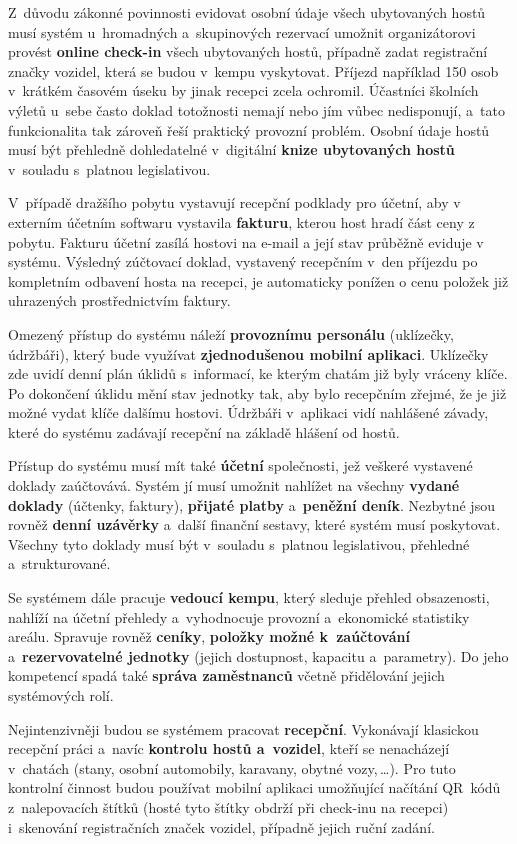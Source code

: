 Z~důvodu zákonné povinnosti evidovat osobní údaje všech ubytovaných hostů musí systém u~hromadných a~skupinových rezervací umožnit organizátorovi provést \textbf{online check-in} všech ubytovaných hostů, případně zadat registrační značky vozidel, která se budou v~kempu vyskytovat.
Příjezd například 150 osob v~krátkém časovém úseku by jinak recepci zcela ochromil.
Účastníci školních výletů u~sebe často doklad totožnosti nemají nebo jím vůbec nedisponují, a~tato funkcionalita tak zároveň řeší praktický provozní problém.
Osobní údaje hostů musí být přehledně dohledatelné v~digitální \textbf{knize ubytovaných hostů} v~souladu s~platnou legislativou.

V~případě dražšího pobytu vystavují recepční podklady pro účetní, aby v externím účetním softwaru vystavila \textbf{fakturu}, kterou host hradí část ceny z pobytu.
Fakturu účetní zasílá hostovi na e-mail a její stav průběžně eviduje v systému.
Výsledný zúčtovací doklad, vystavený recepčním v~den příjezdu po kompletním odbavení hosta na recepci, je automaticky ponížen o cenu položek již uhrazených prostřednictvím faktury.

Omezený přístup do systému náleží \textbf{provoznímu personálu} (uklízečky, údržbáři), který bude využívat \textbf{zjednodušenou mobilní aplikaci}.
Uklízečky zde uvidí denní plán úklidů s~informací, ke kterým chatám již byly vráceny klíče.
Po dokončení úklidu mění stav jednotky tak, aby bylo recepčním zřejmé, že je již možné vydat klíče dalšímu hostovi.
Údržbáři v~aplikaci vidí nahlášené závady, které do systému zadávají recepční na základě hlášení od hostů.

Přístup do systému musí mít také \textbf{účetní} společnosti, jež veškeré vystavené doklady zaúčtovává.
Systém jí musí umožnit nahlížet na všechny \textbf{vydané doklady} (účtenky, faktury), \textbf{přijaté platby} a~\textbf{peněžní deník}.
Nezbytné jsou rovněž \textbf{denní uzávěrky} a~další finanční sestavy, které systém musí poskytovat.
Všechny tyto doklady musí být v~souladu s~platnou legislativou, přehledné a~strukturované.

Se systémem dále pracuje \textbf{vedoucí kempu}, který sleduje přehled obsazenosti, nahlíží na účetní přehledy a~vyhodnocuje provozní a~ekonomické statistiky areálu.
Spravuje rovněž \textbf{ceníky}, \textbf{položky možné k~zaúčtování} a~\textbf{rezervovatelné jednotky} (jejich dostupnost, kapacitu a~parametry).
Do jeho kompetencí spadá také \textbf{správa zaměstnanců} včetně přidělování jejich systémových rolí.

Nejintenzivněji budou se systémem pracovat \textbf{recepční}.
Vykonávají klasickou recepční práci a~navíc \textbf{kontrolu hostů a~vozidel}, kteří se nenacházejí v~chatách (stany, osobní automobily, karavany, obytné vozy,\,\ldots).
Pro tuto kontrolní činnost budou používat mobilní aplikaci umožňující načítání QR~kódů z~nalepovacích štítků (hosté tyto štítky obdrží při check-inu na recepci) i~skenování registračních značek vozidel, případně jejich ruční zadání.

